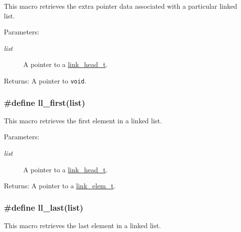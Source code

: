 This macro retrieves the extra pointer data associated with a particular linked list.

\begin{Desc}
\item[Parameters:]
\begin{description}
\item[{\em list}]A pointer to a \hyperlink{group__dbprim__link_a0}{link\_\-head\_\-t}.\end{description}
\end{Desc}
\begin{Desc}
\item[Returns:]A pointer to {\tt void}. \end{Desc}
\hypertarget{group__dbprim__link_a16}{
\subsubsection[ll\_\-first]{\setlength{\rightskip}{0pt plus 5cm}\#define ll\_\-first(list)}}
\label{group__dbprim__link_a16}


This macro retrieves the first element in a linked list.

\begin{Desc}
\item[Parameters:]
\begin{description}
\item[{\em list}]A pointer to a \hyperlink{group__dbprim__link_a0}{link\_\-head\_\-t}.\end{description}
\end{Desc}
\begin{Desc}
\item[Returns:]A pointer to a \hyperlink{group__dbprim__link_a1}{link\_\-elem\_\-t}. \end{Desc}
\hypertarget{group__dbprim__link_a17}{
\subsubsection[ll\_\-last]{\setlength{\rightskip}{0pt plus 5cm}\#define ll\_\-last(list)}}
\label{group__dbprim__link_a17}


This macro retrieves the last element in a linked list.

